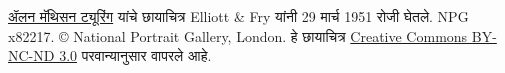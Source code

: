 \href{https://www.npg.org.uk/collections/search/portrait/mw63680/Alan-Turing}{ॲलन
मॅथिसन ट्यूरिंग} यांचे छायाचित्र Elliott \& Fry यांनी 29 मार्च 1951
रोजी घेतले. NPG x82217. © National Portrait Gallery,
London. हे छायाचित्र
\href{https://creativecommons.org/licenses/by-nc-nd/3.0/}{Creative
Commons BY-NC-ND 3.0} परवान्यानुसार वापरले आहे.
